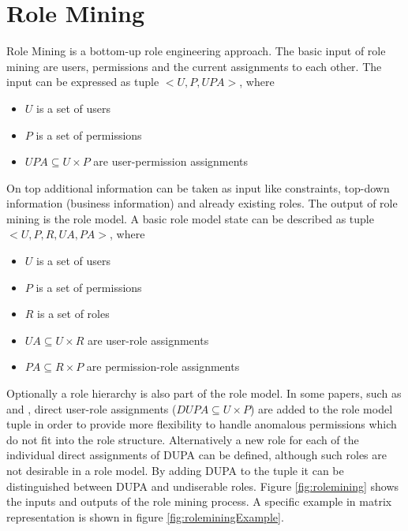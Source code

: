     \section{Role Mining}
    Role Mining is a bottom-up role engineering approach. The basic input of role mining are users, permissions and the current assignments to each other. The input can be expressed as tuple $<U,P,UPA>$, where
    
    \begin{itemize}[noitemsep,topsep=0pt,parsep=0pt,partopsep=0pt]
        \item \textbf{$U$} is a set of users
        \item \textbf{$P$} is a set of permissions
        \item \textbf{$UPA \subseteq U \times P$} are user-permission assignments
    \end{itemize}
    
    On top additional information can be taken as input like constraints, top-down information (business information) and already existing roles. The output of role mining is the role model. A basic role model state can be described as tuple $<U,P,R,UA,PA>$, where
    
    \begin{itemize}[noitemsep,topsep=0pt,parsep=0pt,partopsep=0pt]
        \item \textbf{$U$} is a set of users
        \item \textbf{$P$} is a set of permissions
        \item \textbf{$R$} is a set of roles
        \item \textbf{$UA \subseteq U \times R$} are user-role assignments
        \item \textbf{$PA \subseteq R \times P$} are permission-role assignments
    \end{itemize}
    
    Optionally a role hierarchy is also part of the role model. In some papers, such as \cite{Molloy} and \cite{DuChang}, direct user-role assignments ($DUPA \subseteq U \times P$) are added to the role model tuple in order to provide more flexibility to handle anomalous permissions which do not fit into the role structure. Alternatively a new role for each of the individual direct assignments of DUPA can be defined, although such roles are not desirable in a role model. By adding DUPA to the tuple it can be distinguished between DUPA and undiserable roles. Figure \ref{fig:rolemining} shows the inputs and outputs of the role mining process.  A specific example in matrix representation is shown in figure \ref{fig:roleminingExample}.
    
